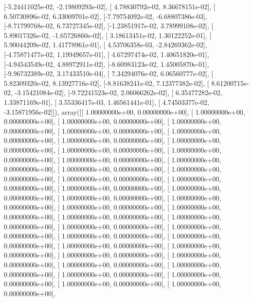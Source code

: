 \documentclass{article}
\begin{document}
       [-5.24411025e-02, -2.19809293e-02],
       [ 4.78830792e-02,  8.36678151e-02],
       [ 6.50730896e-02,  6.33009701e-02],
       [-7.79754092e-02, -6.68807386e-03],
       [-8.71799768e-02,  6.73727345e-02],
       [-1.23851917e-02,  3.78999108e-02],
       [ 5.89017326e-02, -1.65726860e-02],
       [ 3.18613451e-02,  1.30122252e-01],
       [ 5.90044209e-02,  1.41778961e-01],
       [ 4.53706358e-03, -2.84269362e-02],
       [-4.75871477e-02,  1.19949657e-01],
       [ 4.67297474e-02,  1.40651820e-01],
       [-4.94543549e-02,  4.88972911e-02],
       [-8.60983123e-02,  1.45005870e-01],
       [-9.96732389e-02,  3.17433510e-04],
       [ 7.34294076e-02,  6.06560777e-02],
       [ 5.82309320e-02,  8.13927716e-02],
       [-8.81638241e-02,  7.12377382e-02],
       [ 8.61200715e-02, -3.15421084e-02],
       [-9.72241523e-02,  2.06066262e-02],
       [ 6.35477282e-02,  1.33871169e-01],
       [ 3.55336417e-03,  1.46561441e-01],
       [ 4.74503377e-02, -3.15871956e-02]]), array([[ 1.00000000e+00,  0.00000000e+00],
       [ 1.00000000e+00,  0.00000000e+00],
       [ 1.00000000e+00,  0.00000000e+00],
       [ 1.00000000e+00,  0.00000000e+00],
       [ 1.00000000e+00,  0.00000000e+00],
       [ 1.00000000e+00,  0.00000000e+00],
       [ 1.00000000e+00,  0.00000000e+00],
       [ 1.00000000e+00,  0.00000000e+00],
       [ 1.00000000e+00,  0.00000000e+00],
       [ 1.00000000e+00,  0.00000000e+00],
       [ 1.00000000e+00,  0.00000000e+00],
       [ 1.00000000e+00,  0.00000000e+00],
       [ 1.00000000e+00,  0.00000000e+00],
       [ 1.00000000e+00,  0.00000000e+00],
       [ 1.00000000e+00,  0.00000000e+00],
       [ 1.00000000e+00,  0.00000000e+00],
       [ 1.00000000e+00,  0.00000000e+00],
       [ 1.00000000e+00,  0.00000000e+00],
       [ 1.00000000e+00,  0.00000000e+00],
       [ 1.00000000e+00,  0.00000000e+00],
       [ 1.00000000e+00,  0.00000000e+00],
       [ 1.00000000e+00,  0.00000000e+00],
       [ 1.00000000e+00,  0.00000000e+00],
       [ 1.00000000e+00,  0.00000000e+00],
       [ 1.00000000e+00,  0.00000000e+00],
       [ 1.00000000e+00,  0.00000000e+00],
       [ 1.00000000e+00,  0.00000000e+00],
       [ 1.00000000e+00,  0.00000000e+00],
       [ 1.00000000e+00,  0.00000000e+00],
       [ 1.00000000e+00,  0.00000000e+00],
       [ 1.00000000e+00,  0.00000000e+00],
       [ 1.00000000e+00,  0.00000000e+00],
       [ 1.00000000e+00,  0.00000000e+00],
       [ 1.00000000e+00,  0.00000000e+00],
       [ 1.00000000e+00,  0.00000000e+00],
       [ 1.00000000e+00,  0.00000000e+00],
       [ 1.00000000e+00,  0.00000000e+00],
       [ 1.00000000e+00,  0.00000000e+00],
\end{document}
